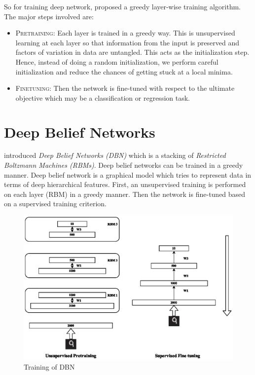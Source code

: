 So for training deep network, \citet{hinton2006reducing} proposed a greedy layer-wise training algorithm.  The major steps involved are:
\begin{itemize}
\item \textsc{Pretraining}: Each layer is trained in a greedy way.  This is unsupervised learning at each layer so that information from the input is preserved and factors of variation in data are untangled.  This acts as the initialization step.  Hence, instead of doing a random initialization, we perform careful initialization and reduce the chances of getting stuck at a local minima.
\item \textsc{Finetuning}: Then the network is fine-tuned with respect to the ultimate objective which may be a classification or regression task.
\end{itemize}

\section{Deep Belief Networks}
\citet{hinton2006reducing} introduced \emph{Deep Belief Networks (DBN)} which is a stacking of \emph{Restricted Boltzmann Machines (RBMs)}.  Deep belief networks can be trained in a greedy manner\cite{hinton2006reducing}.  Deep belief network is a graphical model which tries to represent data in terms of deep hierarchical features.  First, an unsupervised training is performed on each layer (RBM) in a greedy manner.  Then the network is fine-tuned based on a supervised training criterion.\\
\begin{figure}[!ht]
\centering
\includegraphics[width=1\textwidth]{./imgs/RBM_Train.eps} 
\caption{Training of DBN}
\end{figure}

